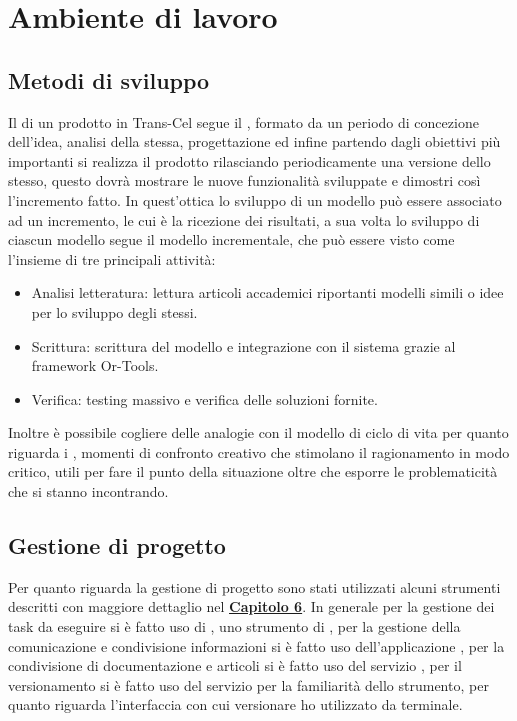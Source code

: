 \section{Ambiente di lavoro}
\subsection{Metodi di sviluppo}
Il  di un prodotto in Trans-Cel segue il , formato da un periodo di concezione dell'idea, analisi della stessa, progettazione ed infine partendo dagli obiettivi più importanti si realizza il prodotto rilasciando periodicamente una versione dello stesso, questo dovrà mostrare le nuove funzionalità sviluppate e dimostri così l'incremento fatto. In quest'ottica lo sviluppo di un modello può essere associato ad un incremento, le cui  è la ricezione dei risultati, a sua volta lo sviluppo di ciascun modello segue il modello incrementale, che può essere visto come l'insieme di tre principali attività:
\begin{itemize}
	\item Analisi letteratura: lettura articoli accademici riportanti modelli simili o idee per lo sviluppo degli stessi.
	\item Scrittura: scrittura del modello e integrazione con il sistema grazie al framework Or-Tools.
	\item Verifica: testing massivo e verifica delle soluzioni fornite.
\end{itemize}
Inoltre è possibile cogliere delle analogie con il modello di ciclo di vita  per quanto riguarda i , momenti di confronto creativo che stimolano il ragionamento in modo critico, utili per fare il punto della situazione oltre che esporre le problematicità che si stanno incontrando.

\subsection{Gestione di progetto}
Per quanto riguarda la gestione di progetto sono stati utilizzati alcuni strumenti descritti con maggiore dettaglio nel \hyperlink{(chap:capitolo6)}{\textbf{Capitolo 6}}. In generale per la gestione dei task da eseguire si è fatto uso di , uno strumento di , per la gestione della comunicazione e condivisione informazioni si è fatto uso dell'applicazione , per la condivisione di documentazione e articoli si è fatto uso del servizio , per il versionamento si è fatto uso del servizio  per la familiarità dello strumento, per quanto riguarda l'interfaccia con cui versionare ho utilizzato  da terminale.
	
